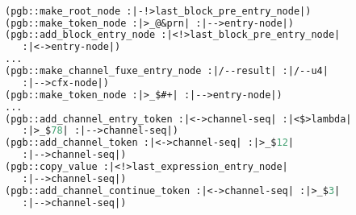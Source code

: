 \begin{lstlisting}[language = lisp, numbers = none, 
caption={Hypergraph Intermediate Representation},label={lst:figIR},
    basicstyle = \ttfamily\bfseries\tiny, linewidth = .95\linewidth] 

(pgb::make_root_node :|-!>last_block_pre_entry_node|)
(pgb::make_token_node :|>_@&prn| :|-->entry-node|)
(pgb::add_block_entry_node :|<!>last_block_pre_entry_node| 
   :|<->entry-node|)
...
(pgb::make_channel_fuxe_entry_node :|/--result| :|/--u4| 
   :|-->cfx-node|)
(pgb::make_token_node :|>_$#+| :|-->entry-node|)
...
(pgb::add_channel_entry_token :|<->channel-seq| :|<$>lambda| 
   :|>_$78| :|-->channel-seq|)
(pgb::add_channel_token :|<->channel-seq| :|>_$12| 
   :|-->channel-seq|)
(pgb::copy_value :|<!>last_expression_entry_node| 
   :|-->channel-seq|)
(pgb::add_channel_continue_token :|<->channel-seq| :|>_$3| 
   :|-->channel-seq|)

\end{lstlisting}
\begin{tikzpicture}[remember picture, overlay, text width=.9\linewidth]

\end{tikzpicture} 
